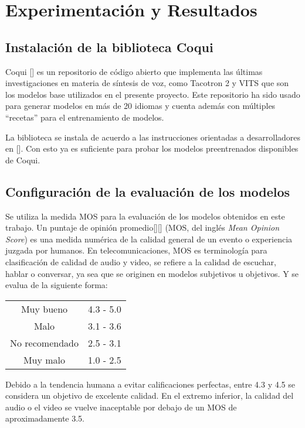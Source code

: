 \chapter{Experimentación y Resultados}\label{chapter:implementation}

\section{Instalación de la biblioteca Coqui}
Coqui [\cite{coqui-doc}] es un repositorio de código abierto que implementa las últimas investigaciones en materia de síntesis de voz, como Tacotron 2 y VITS que son los modelos base utilizados en el presente proyecto. Este repositorio ha sido usado para generar modelos en más de 20 idiomas  y cuenta además con múltiples ``recetas'' para el entrenamiento de modelos. 

La biblioteca se instala de acuerdo a las instrucciones orientadas a desarrolladores en [\cite{coqui-doc}].
Con esto ya es suficiente para probar los modelos preentrenados disponibles de Coqui.

\section{Configuración de la evaluación de los modelos}
Se utiliza la medida MOS para la evaluación de los modelos obtenidos en este trabajo. Un puntaje de opinión promedio[\cite{mos}][\cite{mos1}] (MOS, del inglés \textit{Mean Opinion Score}) es una medida numérica de la calidad general de un evento o experiencia juzgada por humanos. En telecomunicaciones, MOS es terminología para clasificación de calidad de audio y video, se refiere a la calidad de escuchar, hablar o conversar, ya sea que se originen en modelos subjetivos u objetivos. Y se evalua de la siguiente forma:
 
  \begin{longtable} [c] { | c | c | }
	\hline
	\endfirsthead
\hline
\endhead
\hline
\endfoot
\hline
\endlastfoot
Muy bueno & 4.3 - 5.0 \\
Malo & 3.1 - 3.6 \\
No recomendado &  2.5 - 3.1\\
Muy malo & 1.0 - 2.5
\label {longtable:1}
\end{longtable}

Debido a la tendencia humana a evitar calificaciones perfectas, entre 4.3 y 4.5 se considera un objetivo de excelente calidad. En el extremo inferior, la calidad del audio o el video se vuelve inaceptable por debajo de un MOS de aproximadamente 3.5. \\

